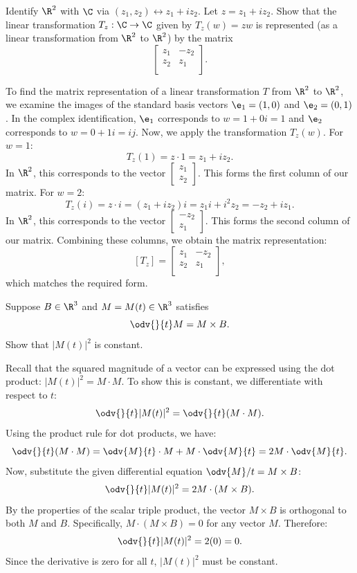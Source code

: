 \begin{problem}[4]
  Identify $\R^2$ with $\C$ via $(z_1, z_2) \leftrightarrow z_1 + iz_2$. Let $z = z_1 + iz_2$. Show that the linear transformation $T_z : \C \to \C$ given by $T_z(w) = zw$ is represented (as a linear transformation from $\R^2$ to $\R^2$) by the matrix
  \[%
    \begin{bmatrix}
      z_1 & -z_2 \\
      z_2 & z_1 \\
    \end{bmatrix}
  .\]%
\end{problem}

\begin{solution}
  To find the matrix representation of a linear transformation $T$ from $\R^2$ to $\R^2$, we examine the images of the standard basis vectors $\e_1 = (1, 0)$ and $\e_2 = (0, 1)$. In the complex identification, $\e_1$ corresponds to $w = 1 + 0i = 1$ and $\e_2$ corresponds to $w = 0 + 1i = ij$. Now, we apply the transformation $T_z(w)$. For $w = 1$:
  \[%
    T_z(1) = z \cdot 1 = z_1 + iz_2
  .\]%
  In $\R^2$, this corresponds to the vector $\begin{bmatrix} z_1 \\ z_2 \end{bmatrix}$. This forms the first column of our matrix. For $w = 2$:
  \[%
    T_z(i) = z \cdot i = (z_1 + iz_2)i = z_1 i + i^2 z_2 = -z_2 + iz_1 
  .\]%
  In $\R^2$, this corresponds to the vector $\begin{bmatrix} -z_2 \\ z_1 \end{bmatrix}$. This forms the second column of our matrix. Combining these columns, we obtain the matrix representation:
  \[%
    [T_z] = \begin{bmatrix}
      z_1 & -z_2 \\
      z_2 & z_1 \\
    \end{bmatrix}
  ,\]%
  which matches the required form.
\end{solution}

\begin{problem}[5]
  Suppose $B \in \R^3$ and $M = M(t) \in \R^3$ satisfies
  \[%
    \odv{}{t} M = M \times B
  .\]%
  Show that $|M(t)|^2$ is constant.
\end{problem}

\begin{solution}
  Recall that the squared magnitude of a vector can be expressed using the dot product: $|M(t)|^2 = M \cdot M$. To show this is constant, we differentiate with respect to $t$:
  \[%
    \odv{}{t} |M(t)|^2 = \odv{}{t} (M \cdot M)
  .\]%
  Using the product rule for dot products, we have:
  \[%
    \odv{}{t} (M \cdot M) = \odv{M}{t} \cdot M + M \cdot \odv{M}{t} = 2 M \cdot \odv{M}{t}
  .\]%
  Now, substitute the given differential equation $\odv{M}/{t} = M \times B$:
  \[%
    \odv{}{t} |M(t)|^2 = 2 M \cdot (M \times B)
  .\]%
  By the properties of the scalar triple product, the vector $M \times B$ is orthogonal to both $M$ and $B$. Specifically, $M \cdot (M \times B) = 0$ for any vector $M$. Therefore:
  \[%
    \odv{}{t} |M(t)|^2 = 2(0) = 0
  .\]%
  Since the derivative is zero for all $t$, $|M(t)|^2$ must be constant.
\end{solution}
